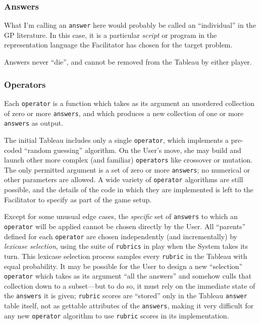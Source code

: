 \subsubsection{Answers}\hypertarget{answers}{}\label{answers}

What I'm calling an \texttt{answer} here would probably be called an ``individual'' in the GP literature. In this case, it is a particular \emph{script} or program in the representation language the Facilitator has chosen for the target problem.

Answers never ``die'', and cannot be removed from the Tableau by either player.

\subsubsection{Operators}\hypertarget{operators}{}\label{operators}

Each \texttt{operator} is a function which takes as its argument an unordered  collection of zero or more \texttt{answers}, and which produces a new collection of one or more \texttt{answers} as output.

The initial Tableau includes only a single \texttt{operator}, which implements a pre-coded ``random guessing'' algorithm. On the User's move, she may build and launch other more complex (and familiar) \texttt{operators} like crossover or mutation. The only permitted argument is a set of zero or more \texttt{answers}; no numerical or other parameters are allowed. A wide variety of \texttt{operator} algorithms are still possible, and the details of the code in which they are implemented is left to the Facilitator to specify as part of the game setup.

Except for some unusual edge cases, the \emph{specific} set of \texttt{answers} to which an \texttt{operator} will be applied cannot be chosen directly by the User. All ``parents'' defined for each \texttt{operator} are chosen independently (and incrementally) by \emph{lexicase selection}, using the suite of \texttt{rubrics} in play when the System takes its turn. This lexicase selection process samples every \texttt{rubric} in the Tableau with equal probability. It may be possible for the User to design a new ``selection'' \texttt{operator} which takes as its argument ``all the answers'' and somehow culls that collection down to a subset---but to do so, it must rely on the immediate state of the \texttt{answers} it is given; \texttt{rubric} scores are ``stored'' only in the Tableau \texttt{answer} table itself, not as gettable attributes of the \texttt{answers}, making it very difficult for any new \texttt{operator} algorithm to use \texttt{rubric} scores in its implementation.

